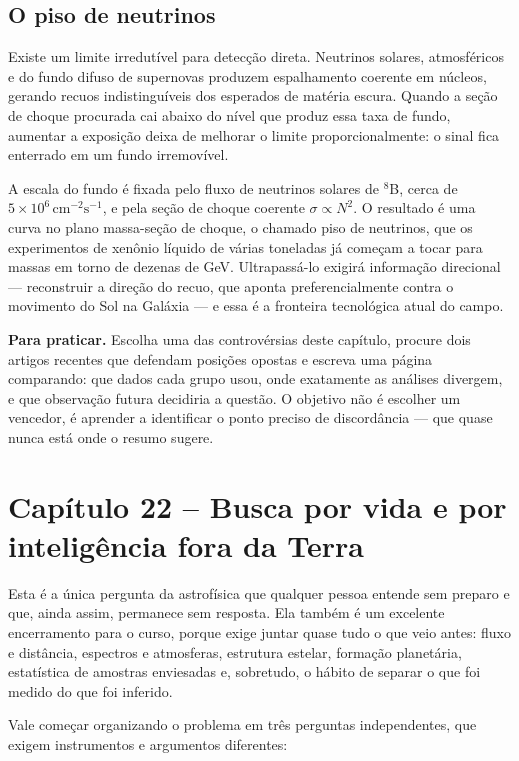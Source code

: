 \documentclass[11pt,a4paper]{article}
\begin{document}
\subsection*{O piso de neutrinos}

Existe um limite irredutível para detecção direta. Neutrinos solares, atmosféricos e do fundo difuso de supernovas produzem espalhamento coerente em núcleos, gerando recuos indistinguíveis dos esperados de matéria escura. Quando a seção de choque procurada cai abaixo do nível que produz essa taxa de fundo, aumentar a exposição deixa de melhorar o limite proporcionalmente: o sinal fica enterrado em um fundo irremovível.

A escala do fundo é fixada pelo fluxo de neutrinos solares de $^{8}$B, cerca de $5\times10^{6}\,\mathrm{cm^{-2}s^{-1}}$, e pela seção de choque coerente $\sigma\propto N^{2}$. O resultado é uma curva no plano massa-seção de choque, o chamado piso de neutrinos, que os experimentos de xenônio líquido de várias toneladas já começam a tocar para massas em torno de dezenas de GeV. Ultrapassá-lo exigirá informação direcional --- reconstruir a direção do recuo, que aponta preferencialmente contra o movimento do Sol na Galáxia --- e essa é a fronteira tecnológica atual do campo.

\textbf{Para praticar.} Escolha uma das controvérsias deste capítulo, procure dois artigos recentes que defendam posições opostas e escreva uma página comparando: que dados cada grupo usou, onde exatamente as análises divergem, e que observação futura decidiria a questão. O objetivo não é escolher um vencedor, é aprender a identificar o ponto preciso de discordância --- que quase nunca está onde o resumo sugere.


\newpage
\section*{Capítulo 22 -- Busca por vida e por inteligência fora da Terra}
Esta é a única pergunta da astrofísica que qualquer pessoa entende sem preparo e que, ainda assim, permanece sem resposta. Ela também é um excelente encerramento para o curso, porque exige juntar quase tudo o que veio antes: fluxo e distância, espectros e atmosferas, estrutura estelar, formação planetária, estatística de amostras enviesadas e, sobretudo, o hábito de separar o que foi medido do que foi inferido.

Vale começar organizando o problema em três perguntas independentes, que exigem instrumentos e argumentos diferentes:
\end{document}
